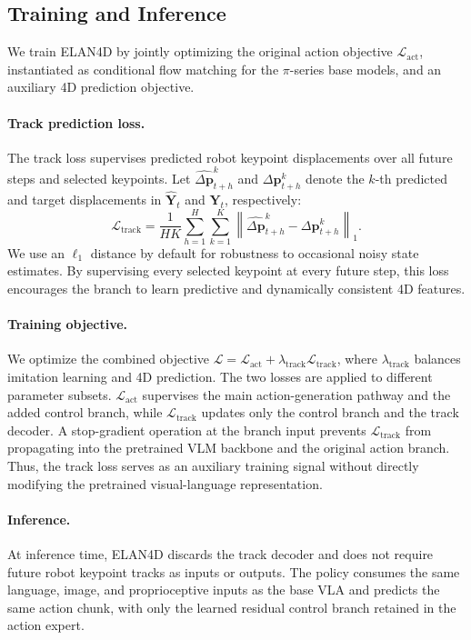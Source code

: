 \subsection{Training and Inference}
\label{sec:training}
We train ELAN4D by jointly optimizing the original action objective \(\mathcal{L}_{\mathrm{act}}\), instantiated as conditional flow matching for the \(\pi\)-series base models, and an
auxiliary 4D prediction objective.\vspace{-1em}

\paragraph{Track prediction loss.}
The track loss supervises predicted robot keypoint displacements over all future steps and selected keypoints. Let \(\widehat{\Delta\mathbf{p}}_{t+h}^{k}\) and \(\Delta\mathbf{p}_{t+h}^{k}\) denote the \(k\)-th predicted and target displacements in \(\widehat{\mathbf{Y}}_t\) and \(\mathbf{Y}_t\), respectively:
\begin{equation}
    \mathcal{L}_{\mathrm{track}} = \frac{1}{HK} \sum_{h=1}^{H}\sum_{k=1}^{K} \left\| \widehat{\Delta\mathbf{p}}_{t+h}^{k} - \Delta\mathbf{p}_{t+h}^{k} \right\|_{1}.
\end{equation}
We use an \(\ell_1\) distance by default for robustness to occasional noisy state estimates. By supervising every selected keypoint at every future step, this loss encourages the branch to learn predictive and dynamically consistent 4D features.\vspace{-1em}

\paragraph{Training objective.}
We optimize the combined objective \(\mathcal{L} = \mathcal{L}_{\mathrm{act}} + \lambda_{\mathrm{track}} \mathcal{L}_{\mathrm{track}}\), where \(\lambda_{\mathrm{track}}\) balances imitation learning and 4D prediction. The two losses are applied to different parameter subsets. \(\mathcal{L}_{\mathrm{act}}\) supervises the main action-generation pathway and the added control branch, while \(\mathcal{L}_{\mathrm{track}}\) updates only the control branch and the track decoder. A stop-gradient operation at the branch input prevents \(\mathcal{L}_{\mathrm{track}}\) from propagating into the pretrained VLM backbone and the original action branch. Thus, the track loss serves as an auxiliary training signal without directly modifying the pretrained visual-language representation.\vspace{-1em}

\paragraph{Inference.}
At inference time, ELAN4D discards the track decoder and does not require future robot keypoint tracks as inputs or outputs. The policy consumes the same language, image, and proprioceptive inputs as the base VLA and predicts the same action chunk, with only the learned residual control branch retained in the action expert.\vspace{-1em}
